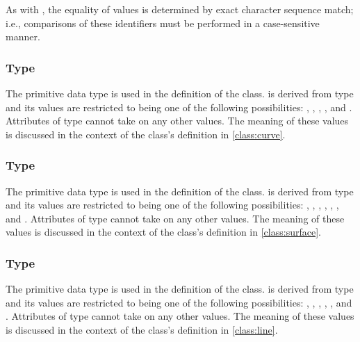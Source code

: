 As with \hyperref[type:numlsid]{}, the equality of  values is determined by exact character sequence match; i.e., comparisons of these identifiers must be performed in a case-sensitive manner.

\subsubsection[\element{CurveType}]{Type }
\label{type:curveType}

The  primitive data type is used in the definition of the \Curve class.   is derived from type  and its values are restricted to being one of the following possibilities: , , , , and .  Attributes of type  cannot take on any other values.  The meaning of these values is discussed in the context of the \Curve class's definition in \ref{class:curve}.

\subsubsection[\element{SurfaceType}]{Type }
\label{type:surfaceType}

The  primitive data type is used in the definition of the \Surface class.   is derived from type  and its values are restricted to being one of the following possibilities: , , , , , , and .  Attributes of type  cannot take on any other values.  The meaning of these values is discussed in the context of the \Surface class's definition in \ref{class:surface}.

\subsubsection[\element{LineType}]{Type }
\label{type:lineType}

The  primitive data type is used in the definition of the \Line class.   is derived from type  and its values are restricted to being one of the following possibilities: , , , , , and .  Attributes of type  cannot take on any other values.  The meaning of these values is discussed in the context of the \Line class's definition in \ref{class:line}.

